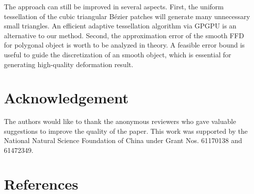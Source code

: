 \documentclass[3p]{elsarticle}
\begin{document}
The approach can still be improved in several aspects. First, the uniform tessellation of the cubic triangular B\'ezier
patches will generate many unnecessary small triangles. An efficient adaptive tessellation algorithm via GPGPU is an
alternative to our method. Second, the approximation error of the smooth FFD for polygonal object is worth to be
analyzed in theory. A feasible error bound is useful to guide the discretization of an smooth object, which is essential
for generating high-quality deformation result.

\section{Acknowledgement}

The authors would like to thank the anonymous reviewers who gave valuable suggestions to improve the quality of the
paper. This work was supported by the National Natural Science Foundation of China under Grant Nos. 61170138 and
61472349.

\section*{References}


\end{document}
